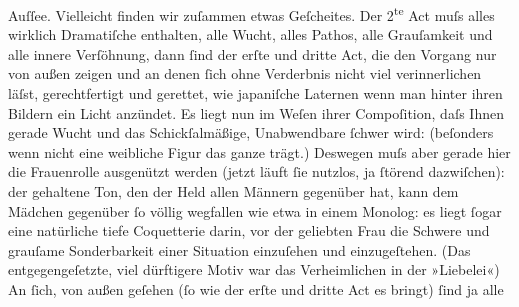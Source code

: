 \begin{ledgroupsized}[t]{13cm}
                        Auſſee. Vielleicht finden wir zuſammen
                    etwas Geſcheites.\pend
           \pstart
           {\pb}Der 2\textsuperscript{te}{ }Act muſs alles wirklich Dramatiſche
                    enthalten, alle Wucht, alles Pathos, alle Grauſamkeit und alle innere Verſöhnung, dann ſind der erſte und
                    dritte Act, die den Vorgang nur von außen zeigen und an denen ſich ohne
                    Verderbnis nicht viel verinnerlichen läſst, gerechtfertigt und gerettet, wie
                        japaniſche Laternen wenn man hinter ihren Bildern ein Licht anzündet. Es liegt
                        {\pb}nun im Weſen ihrer
                    Compoſition, daſs Ihnen gerade Wucht und das Schickſalmäßige, Unabwendbare
                    ſchwer wird: (beſonders wenn nicht eine weibliche Figur das ganze trägt.)
                    Deswegen muſs aber gerade hier die Frauenrolle ausgenützt werden (jetzt läuft
                    ſie nutzlos, ja ſtörend dazwiſchen): der gehaltene Ton, den der Held allen
                    Männern gegenüber hat, kann dem Mädchen gegenüber ſo völlig wegfallen wie etwa
                    in einem Monolog: es liegt ſogar eine natürliche tiefe Coquetterie darin, {\pb}vor der geliebten Frau die
                    Schwere und grauſame Sonderbarkeit einer Situation einzuſehen und einzugeſtehen.
                    (Das entgegengeſetzte, viel dürftigere Motiv war das Verheimlichen in der
                        »Liebelei«)\pend
           \pstart
           An ſich, von außen geſehen (ſo wie der erſte
                    und dritte Act es bringt) ſind ja alle

\end{ledgroupsized}
